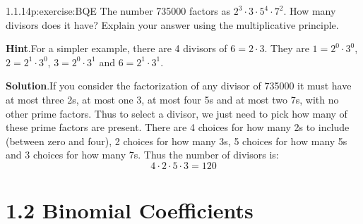 \documentclass[twoside,11pt,]{book}
\newcommand{\blocktitlefont}{\relax}
\numberwithin{equation}{chapter}
\begin{document}
\begin{divisionsolution}{1.1.14}{}{p:exercise:BQE}%
The number 735000 factors as \(2^3 \cdot 3 \cdot 5^4 \cdot 7^2\). How many divisors does it have? Explain your answer using the multiplicative principle.%
\par\smallskip%
\noindent\textbf{\blocktitlefont Hint}.\quad{}For a simpler example, there are 4 divisors of \(6 = 2\cdot 3\).  They are \(1 = 2^0\cdot 3^0\), \(2 = 2^1\cdot 3^0\), \(3 = 2^0\cdot 3^1\) and \(6 = 2^1\cdot 3^1\).%
\par\smallskip%
\noindent\textbf{\blocktitlefont Solution}.\quad{}If you consider the factorization of any divisor of 735000 it must have at most three 2s, at most one 3, at most four 5s and at most two 7s, with no other prime factors. Thus to select a divisor, we just need to pick how many of these prime factors are present. There are 4 choices for how many 2s to include (between zero and four), 2 choices for how many 3s, 5 choices for how many 5s and 3 choices for how many 7s. Thus the number of divisors is:%
\begin{equation*}
4\cdot 2 \cdot 5 \cdot 3 = 120
\end{equation*}
%
\end{divisionsolution}%
\section*{1.2 Binomial Coefficients}
\end{document}
